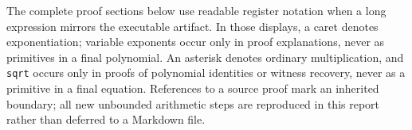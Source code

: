 The complete proof sections below use readable register notation when a long expression mirrors the executable artifact. In those displays, a caret denotes exponentiation; variable exponents occur only in proof explanations, never as primitives in a final polynomial. An asterisk denotes ordinary multiplication, and \texttt{sqrt} occurs only in proofs of polynomial identities or witness recovery, never as a primitive in a final equation. References to a source proof mark an inherited boundary; all new unbounded arithmetic steps are reproduced in this report rather than deferred to a Markdown file.
